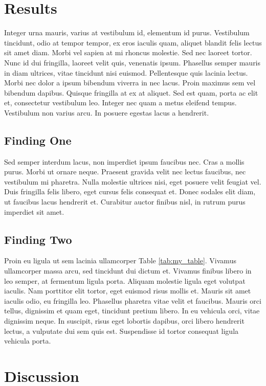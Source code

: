 \documentclass[12pt,letterpaper]{article} %
\begin{document}
	\section*{Results}
	
	Integer urna mauris, varius at vestibulum id, elementum id purus. Vestibulum tincidunt, odio at tempor tempor, ex eros iaculis quam, aliquet blandit felis lectus sit amet diam. Morbi vel sapien at mi rhoncus molestie. Sed nec laoreet tortor. Nunc id dui fringilla, laoreet velit quis, venenatis ipsum. Phasellus semper mauris in diam ultrices, vitae tincidunt nisi euismod. Pellentesque quis lacinia lectus. Morbi nec dolor a ipsum bibendum viverra in nec lacus. Proin maximus sem vel bibendum dapibus. Quisque fringilla at ex at aliquet. Sed est quam, porta ac elit et, consectetur vestibulum leo. Integer nec quam a metus eleifend tempus. Vestibulum non varius arcu. In posuere egestas lacus a hendrerit.
	
	\subsection*{Finding One}
	
	Sed semper interdum lacus, non imperdiet ipsum faucibus nec. Cras a mollis purus. Morbi ut ornare neque. Praesent gravida velit nec lectus faucibus, nec vestibulum mi pharetra. Nulla molestie ultrices nisi, eget posuere velit feugiat vel. Duis fringilla felis libero, eget cursus felis consequat et. Donec sodales elit diam, ut faucibus lacus hendrerit et. Curabitur auctor finibus nisl, in rutrum purus imperdiet sit amet.
	\subsection*{Finding Two}
	Proin eu ligula ut sem lacinia ullamcorper Table \ref{tab:my_table}. Vivamus ullamcorper massa arcu, sed tincidunt dui dictum et. Vivamus finibus libero in leo semper, at fermentum ligula porta. Aliquam molestie ligula eget volutpat iaculis. Nam porttitor elit tortor, eget euismod risus mollis et. Mauris sit amet iaculis odio, eu fringilla leo. Phasellus pharetra vitae velit et faucibus. Mauris orci tellus, dignissim et quam eget, tincidunt pretium libero. In eu vehicula orci, vitae dignissim neque. In suscipit, risus eget lobortis dapibus, orci libero hendrerit lectus, a vulputate dui sem quis est. Suspendisse id tortor consequat ligula vehicula porta.
	
	\section*{Discussion}
	
\end{document}
